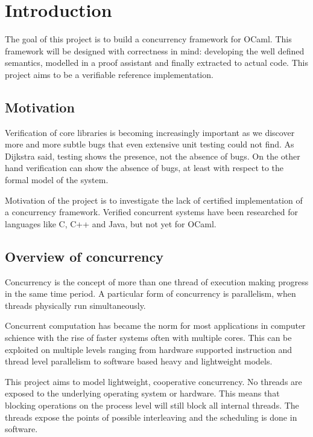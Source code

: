 \documentclass[12pt,twoside,notitlepage]{report}
\begin{document}
\cleardoublepage        %

\setcounter{page}{1}
\pagestyle{headings}
\chapter{Introduction}

The goal of this project is to build a concurrency framework for OCaml. This framework will be designed with correctness in mind: developing the well defined semantics, modelled in a proof assistant and finally extracted to actual code. This project aims to be a verifiable reference implementation. 

\section{Motivation}
Verification of core libraries is becoming increasingly important as we discover more and more subtle bugs that even extensive unit testing could not find. As Dijkstra said, testing shows the presence, not the absence of bugs. On the other hand verification can show the absence of bugs, at least with respect to the formal model of the system.

Motivation of the project is to investigate the lack of certified implementation of a concurrency framework. Verified concurrent systems have been researched for languages like C\cite{sevvcik2011relaxed}, C++ and Java\cite{lochbihler2012machine}, but not yet for OCaml. 

\section{Overview of concurrency}
Concurrency is the concept of more than one thread of execution making progress in the same time period. A particular form of concurrency is parallelism, when threads physically run simultaneously.

Concurrent computation has became the norm for most applications in computer schience with the rise of faster systems often with multiple cores. This can be exploited on multiple levels ranging from hardware supported instruction and thread level parallelism to software based heavy and lightweight models. 

This project aims to model lightweight, cooperative concurrency. No threads are exposed to the underlying operating system or hardware. This means that blocking operations on the process level will still block all internal threads. The threads expose the points of possible interleaving and the scheduling is done in software.
\end{document}
